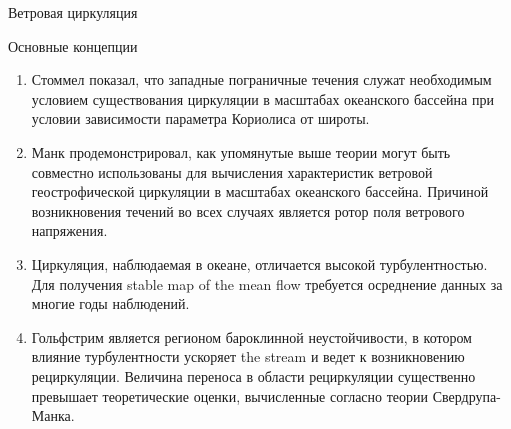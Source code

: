\begin{chapter}{Ветровая циркуляция}
\begin{section}{Основные концепции}
\begin{enumerate}
\item 
Стоммел показал, что западные пограничные течения служат
необходимым условием существования циркуляции в масштабах океанского бассейна
при условии зависимости параметра Кориолиса
от широты.
%

\item 
Манк продемонстрировал, как упомянутые выше теории могут быть совместно
использованы для вычисления характеристик ветровой геострофической циркуляции%
 в масштабах океанского бассейна.
Причиной возникновения течений во всех случаях является ротор поля ветрового
напряжения.
%

\item
Циркуляция, наблюдаемая в океане, отличается высокой турбулентностью.
Для получения stable map of the mean flow требуется осреднение данных
за многие годы наблюдений. 
%

\item 
Гольфстрим является регионом бароклинной неустойчивости,
в котором влияние турбулентности
ускоряет the stream и ведет к возникновению рециркуляции. Величина переноса
в области рециркуляции существенно превышает теоретические 
оценки, вычисленные согласно теории Свердрупа-Манка.
%
\end{enumerate}
\end{section}
\end{chapter}